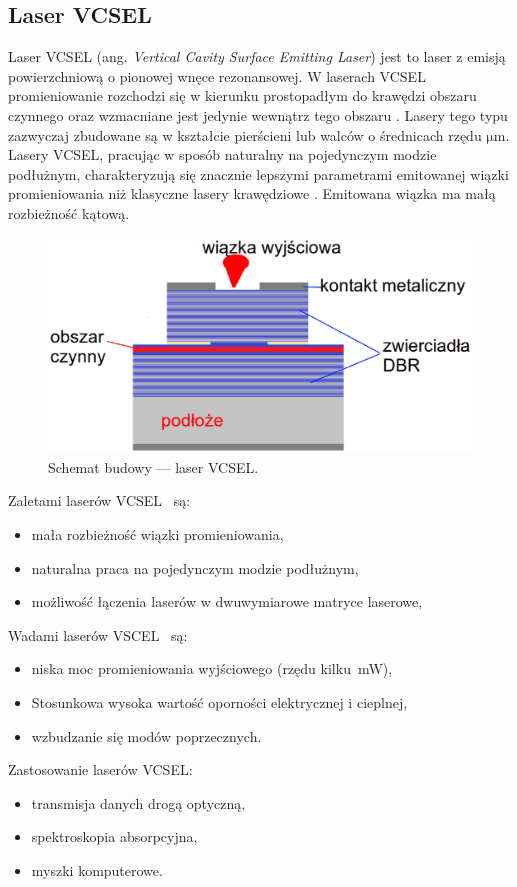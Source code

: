 \subsection{Laser VCSEL}
Laser VCSEL (ang. \textit{Vertical Cavity Surface Emitting Laser}) jest to laser z emisją powierzchniową o pionowej wnęce rezonansowej.
W laserach VCSEL promieniowanie rozchodzi się w kierunku prostopadłym do krawędzi obszaru czynnego oraz wzmacniane jest jedynie
wewnątrz tego obszaru \cite{publikcja_nakwaski}. Lasery tego typu zazwyczaj zbudowane są w kształcie pierścieni
lub walców o średnicach rzędu $\mathrm{\mu}$m.  Lasery VCSEL,   pracując   w   sposób   naturalny   na   pojedynczym   modzie  podłużnym,  charakteryzują się
znacznie lepszymi parametrami emitowanej wiązki promieniowania  niż
klasyczne  lasery krawędziowe \cite{publikcja_magda}. Emitowana wiązka ma małą rozbieżność kątową.
\begin{figure}[H]
\center
\includegraphics[scale=0.25]{vcsel2.eps}
\caption{Schemat budowy --- laser VCSEL.}
\label{fig:teoria_rys_3}
\end{figure}
Zaletami laserów VCSEL~\cite{publikcja_nakwaski} są:
\begin{itemize}
\item mała rozbieżność wiązki promieniowania,
\item naturalna praca na pojedynczym modzie podłużnym,
\item możliwość łączenia laserów w dwuwymiarowe matryce laserowe,
\end{itemize}
Wadami laserów VSCEL~\cite{publikcja_nakwaski} są:
\begin{itemize}
\item niska moc promieniowania wyjściowego (rzędu kilku \,mW),
\item Stosunkowa wysoka wartość oporności elektrycznej i cieplnej,
\item wzbudzanie się modów poprzecznych.
\end{itemize}
Zastosowanie laserów VCSEL:
\begin{itemize}
\item transmisja danych drogą optyczną,
\item spektroskopia absorpcyjna,
\item myszki komputerowe.
\end{itemize}
